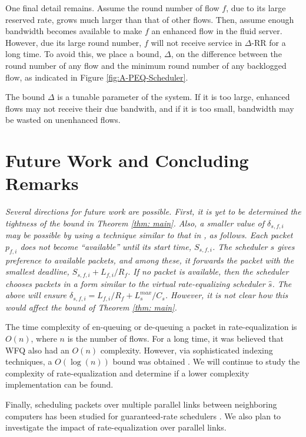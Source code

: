 \documentclass[conference]{IEEEtran}
\begin{document}
One final detail remains. Assume the round number of flow $f$, due to its large 
reserved rate, grows much larger than that of other flows. Then, assume enough 
bandwidth becomes available to make $f$ an enhanced flow in the fluid server.  
However, due its large round number, $f$ will not receive service in 
$\Delta$-RR for a long time.  To avoid this, we place a bound, $\Delta$, on the 
difference between the round number of any flow and the minimum round number of 
any backlogged flow, as indicated in Figure \ref{fig:A-PEQ-Scheduler}. 

The bound $\Delta$ is a tunable parameter of the system. If it is too large, 
enhanced flows may not receive their due bandwith, and if it is too small, 
bandwidth may be wasted on unenhanced flows. 

%
\section{Future Work and Concluding Remarks}
\label{sec: future work}
%


{\em
Several directions for future work are possible. First, it is yet to be 
determined the tightness of the bound in Theorem \ref{thm: main}. Also, a 
smaller value of $\delta_{s,f,i}$ may be possible by using a technique similar 
to that in \cite{RP-Fair-Servers-ToN}, as follows. Each packet $p_{f,i}$ does 
not become ``available'' until its start time, $S_{s,f,i}$. The scheduler $s$ 
gives preference to available packets, and among these, it forwards the packet 
with the smallest deadline, $S_{s,f,i} + L_{f,i}/R_f$. If no packet is 
available, then the scheduler chooses packets in a form similar to the virtual 
rate-equalizing scheduler $\hat{s}$. The above will ensure $\delta_{s,f,i} = 
L_{f,i}/R_f + L^{max}_s/C_s$. However, it is not clear how this would affect 
the bound of Theorem \ref{thm: main}. 

The time complexity of en-queuing or de-queuing a packet in rate-equalization 
is $O(n)$, where $n$ is the number of flows. For a long time, it was believed 
that WFQ also had an $O(n)$ complexity. However, via sophisticated indexing 
techniques, a $O(\log(n))$ bound was obtained \cite{WFQlogN}. We will continue 
to study the complexity of rate-equalization and determine if a lower 
complexity implementation can be found.


Finally, scheduling packets over multiple parallel links between neighboring 
computers has been studied for guaranteed-rate schedulers 
\cite{Cobb-Multi-Channel-JHSN} \cite{Cobb-Multi-Channel-IWQoS} 
\cite{MPGPS-Ozden}. We also plan to investigate the impact of rate-equalization 
over parallel links.
}



\end{document}
